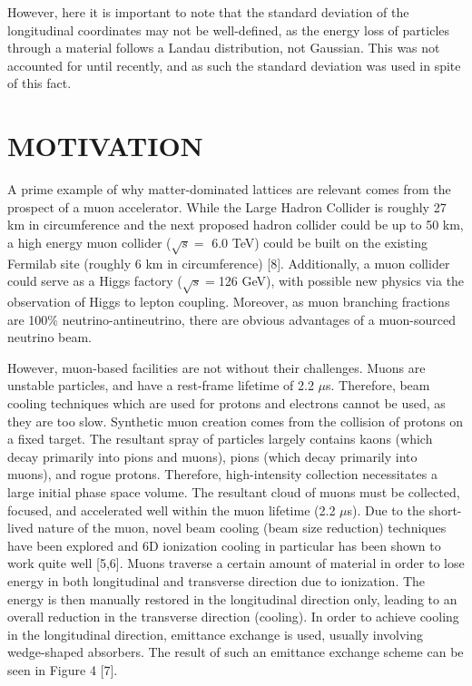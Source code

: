 \documentclass{jacow}
\begin{document}
However, here it is important to note that the standard deviation of the longitudinal coordinates may not be well-defined, as the energy loss of particles through a material follows a Landau distribution, not Gaussian. This was not accounted for until recently, and as such the standard deviation was used in spite of this fact. \par

\section{MOTIVATION}

A prime example of why matter-dominated lattices are relevant comes from the prospect of a muon accelerator. While the Large Hadron Collider is roughly 27 km in circumference and the next proposed hadron collider could be up to 50 km, a high energy muon collider ($\sqrt{s}=$ 6.0 TeV) could be built on the existing Fermilab site (roughly 6 km in circumference) [8]. Additionally, a muon collider could serve as a Higgs factory ($\sqrt{s}=$126 GeV), with possible new physics via the observation of Higgs to lepton coupling. Moreover, as muon branching fractions are 100\% neutrino-antineutrino, there are obvious advantages of a muon-sourced neutrino beam. \par

However, muon-based facilities are not without their challenges. Muons are unstable particles, and have a rest-frame lifetime of 2.2 $\mu$s. Therefore, beam cooling techniques which are used for protons and electrons cannot be used, as they are too slow. Synthetic muon creation comes from the collision of protons on a fixed target. The resultant spray of particles largely contains kaons (which decay primarily into pions and muons), pions (which decay primarily into muons), and rogue protons. Therefore, high-intensity collection necessitates a large initial phase space volume. The resultant cloud of muons must be collected, focused, and accelerated well within the muon lifetime (2.2 $\mu$s). Due to the short-lived nature of the muon, novel beam cooling (beam size reduction) techniques have been explored and 6D ionization cooling in particular has been shown to work quite well [5,6]. Muons traverse a certain amount of material in order to lose energy in both longitudinal and transverse direction due to ionization. The energy is then manually restored in the longitudinal direction only, leading to an overall reduction in the transverse direction (cooling). In order to achieve cooling in the longitudinal direction, emittance exchange is used, usually involving wedge-shaped absorbers. The result of such an emittance exchange scheme can be seen in Figure 4 [7]. \par
\end{document}
